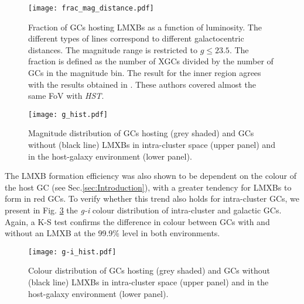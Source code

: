 \documentclass{aa}
\begin{document}
\begin{figure}[]
    \centering
     \texttt{[image: frac\_mag\_distance.pdf]}
    
    \caption{Fraction of GCs hosting LMXBs as a function of luminosity. The different types of lines correspond to different galactocentric distances. The magnitude range is restricted to $g \leq 23.5$. The fraction is defined as the number of XGCs divided by the number of GCs in the magnitude bin. The result for the inner region agrees with the results obtained in \cite{Paolillo2011}. These authors covered almost the same FoV with \textit{HST}. }
    \label{fig:frac_mag_distance}
\end{figure}

\begin{figure}[]
    \centering
    \texttt{[image: g\_hist.pdf]}
    \caption{Magnitude distribution of GCs hosting (grey shaded) and GCs without (black line) LMXBs in intra-cluster space (upper panel) and in the host-galaxy environment (lower panel).  }
    \label{fig:mag_dist}
\end{figure}

The LMXB formation efficiency was also shown to be dependent on the colour of the host GC (see Sec.\ref{sec:Introduction}), with a greater tendency for LMXBs to form in red GCs. To verify whether this trend also holds for intra-cluster GCs, we present in Fig. \ref{fig:col_dist} the \textit{g-i} colour distribution of intra-cluster and galactic GCs. Again, a K-S test confirms the difference in colour between GCs with and without an LMXB at the 99.9\% level in both environments.


\begin{figure}[]
    \centering
    \texttt{[image: g-i\_hist.pdf]}
    \caption{Colour distribution of GCs hosting (grey shaded) and GCs without (black line) LMXBs in intra-cluster space (upper panel) and in the host-galaxy environment (lower panel).  }
    \label{fig:col_dist}
\end{figure}


\end{document}

